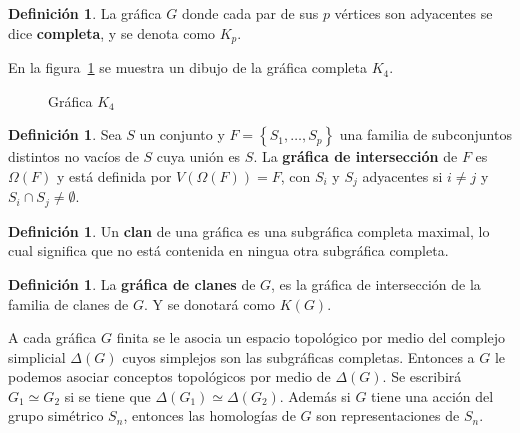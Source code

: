 \documentclass[12pt]{book}
\theoremstyle{definition}
\newtheorem{definition}[theorem]{Definición}
\newcounter{in}
\newcounter{ini}
\begin{document}
\begin{definition}
  \label{complete_graph}
  La gráfica $G$ donde cada par de sus $p$ vértices son adyacentes se
  dice \textbf{completa}, y se denota como $K_{p}$.
\end{definition}

En la figura~\ref{fig:completa} se muestra un dibujo de la gráfica
completa $K_4$.

\begin{figure}[hbtp]
  \centering
  \caption{Gráfica $K_4$}
  \label{fig:completa}
\end{figure}

\begin{definition}
  \label{intersection_graph}
  Sea $S$ un conjunto y $F = \left\{ S_{1}, \ldots, S_{p} \right\}$
  una familia de subconjuntos distintos no vacíos de $S$ cuya unión es
  $S$. La \textbf{gráfica de intersección} de $F$ es $\Omega(F)$ y
  está definida por $V(\Omega(F)) = F$, con $S_{i}$ y $S_{j}$
  adyacentes si $i \neq j$ y $S_{i} \cap S_{j} \neq \emptyset$.
\end{definition}

\begin{definition}
  \label{clique}
  Un \textbf{clan} de una gráfica es una subgráfica completa maximal,
  lo cual significa que no está contenida en ningua otra subgráfica
  completa.
\end{definition}


\begin{definition}
  \label{clique_graph}
  La \textbf{gráfica de clanes} de $G$, es la gráfica de intersección
  de la familia de clanes de $G$. Y se donotará como $K(G)$.
\end{definition}

A cada gráfica $G$ finita se le asocia un espacio topológico por medio
del complejo simplicial $\Delta(G)$ cuyos simplejos son las
subgráficas completas. Entonces a $G$ le podemos asociar conceptos
topológicos por medio de $\Delta(G)$. Se escribirá
$G_{1} \simeq G_{2}$ si se tiene que
$\Delta(G_{1}) \simeq \Delta(G_{2})$.  Además si $G$ tiene una acción
del grupo simétrico $S_{n}$, entonces las homologías de $G$ son
representaciones de $S_{n}$.


\backmatter




\printindex
\end{document}
